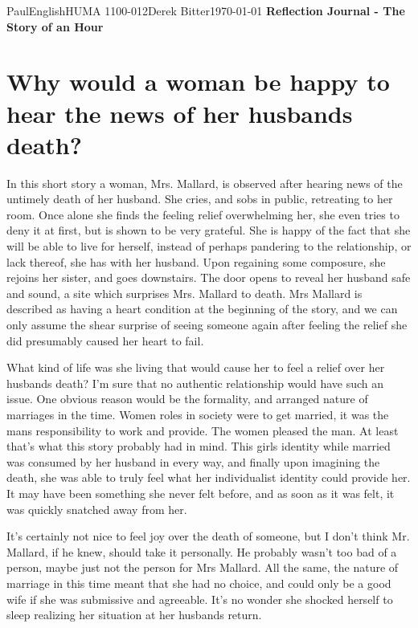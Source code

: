 \documentclass[12pt,letterpaper]{article}
\begin{document}
\begin{mla}{Paul}{English}{HUMA 1100-012}{Derek
    Bitter}{\today}    
    {\textbf{Reflection Journal - The Story of an Hour}}

\section*{Why would a woman be happy to hear the news of her husbands death?}

In this short story a woman, Mrs. Mallard, is observed after hearing news of the untimely death of her husband. She cries, and sobs in public, retreating to her room. Once alone she finds the feeling relief overwhelming her, she even tries to deny it at first, but is shown to be very grateful. She is happy of the fact that she will be able to live for herself, instead of perhaps pandering to the relationship, or lack thereof, she has with her husband. Upon regaining some composure, she rejoins her sister, and goes downstairs. The door opens to reveal her husband safe and sound, a site which surprises Mrs. Mallard to death. Mrs Mallard is described as having a heart condition at the beginning of the story, and we can only assume the shear surprise of seeing someone again after feeling the relief she did presumably caused her heart to fail.

What kind of life was she living that would cause her to feel a relief over her husbands death? I'm sure that no authentic relationship would have such an issue. One obvious reason would be the formality, and arranged nature of marriages in the time. Women roles in society were to get married, it was the mans responsibility to work and provide. The women pleased the man. At least that's what this story probably had in mind. This girls identity while married was consumed by her husband in every way, and finally upon imagining the death, she was able to truly feel what her individualist identity could provide her. It may have been something she never felt before, and as soon as it was felt, it was quickly snatched away from her.

It's certainly not nice to feel joy over the death of someone, but I don't think Mr. Mallard, if he knew, should take it personally. He probably wasn't too bad of a person, maybe just not the person for Mrs Mallard. All the same, the nature of marriage in this time meant that she had no choice, and could only be a good wife if she was submissive and agreeable. It's no wonder she shocked herself to sleep realizing her situation at her husbands return.

\end{mla}
\end{document}
